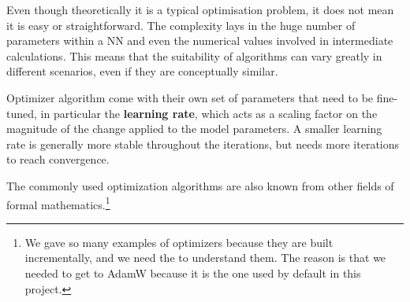 \documentclass[a4paper, 11pt]{report}
\begin{document}
Even though theoretically it is a typical optimisation problem, it does not mean it is easy or straightforward. The complexity lays in the huge number of parameters within a NN and even the numerical values involved in intermediate calculations. This means that the suitability of algorithms can vary greatly in different scenarios, even if they are conceptually similar.

Optimizer algorithm come with their own set of parameters that need to be fine-tuned, in particular the \textbf{learning rate}, which acts as a scaling factor on the magnitude of the change applied to the model parameters. A smaller learning rate is generally more stable throughout the iterations, but needs more iterations to reach convergence.

The commonly used optimization algorithms are also known from other fields of formal mathematics.\footnote{We gave so many examples of optimizers because they are built incrementally, and we need the to understand them. The reason is that we needed to get to AdamW because it is the one used by default in this project.}
\end{document}
